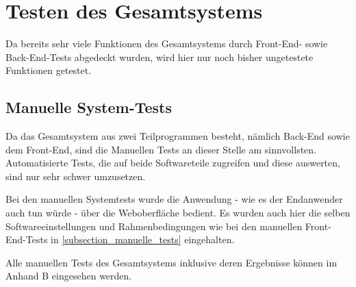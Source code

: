 \section{Testen des Gesamtsystems}
Da bereits sehr viele Funktionen des Gesamtsystems durch Front-End- sowie Back-End-Tests abgedeckt wurden, wird hier nur noch bisher ungetestete Funktionen getestet.

\subsection{Manuelle System-Tests}
Da das Gesamtsystem aus zwei Teilprogrammen besteht, nämlich Back-End sowie dem Front-End, sind die Manuellen Tests an dieser Stelle am sinnvollsten. Automatisierte Tests, die auf beide Softwareteile zugreifen und diese auswerten, sind nur sehr schwer umzusetzen. 

Bei den manuellen Systemtests wurde die Anwendung - wie es der Endanwender auch tun würde - über die Weboberfläche bedient. Es wurden auch hier die selben Softwareeinstellungen und Rahmenbedingungen wie bei den manuellen Front-End-Tests in \ref{subsection_manuelle_tests} eingehalten. 

\vspace{0.5cm}

Alle manuellen Tests des Gesamtsystems inklusive deren Ergebnisse können im Anhand B eingesehen werden.